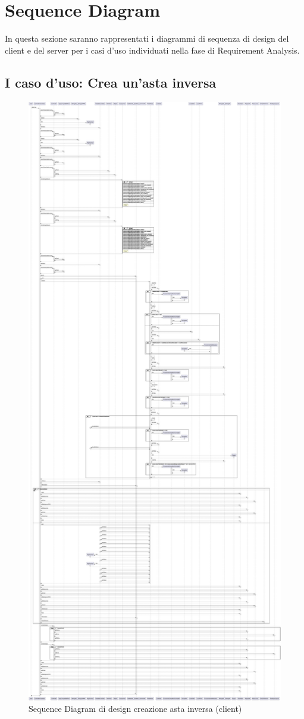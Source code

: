     \clearpage
    
    \section{Sequence Diagram}
        In questa sezione saranno rappresentati i diagrammi di sequenza di design del client e del server per i casi d'uso individuati nella fase di Requirement Analysis.
        
        \subsection{I caso d'uso: Crea un’asta inversa}
            \begin{figure}[htbp!]
                \centering
                    \includegraphics[width=0.47\linewidth]{Immagini/Diagrammi/Sequence Diagram/Design/Client Sequence Design/ClientSequenceCreaAstaDesign.pdf}
                \caption{Sequence Diagram di design creazione asta inversa (client)}
                \label{fig:Sequence Diagram di design creazione asta inversa (client)}
            \end{figure}

